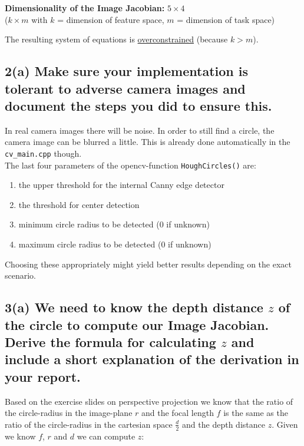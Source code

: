 \documentclass[a4paper,10pt]{article}
\begin{document}
\textbf{Dimensionality of the Image Jacobian:} $5 \times 4$\\
($k \times m$ with $k$ = dimension of feature space, $m$ = dimension of task space)

The resulting system of equations is \underline{overconstrained} (because $k > m$).


\subsection*{2(a) Make sure your implementation is tolerant to adverse camera images and document the steps you did to ensure this.}

In real camera images there will be noise. In order to still find a circle, the camera image can be blurred a little. This is already done automatically in the \texttt{cv\_main.cpp} though.\\
The last four parameters of the opencv-function \texttt{HoughCircles()} are:

\begin{enumerate}
  \item the upper threshold for the internal Canny edge detector
  \item the threshold for center detection
  \item minimum circle radius to be detected (0 if unknown)
  \item maximum circle radius to be detected (0 if unknown)
\end{enumerate}

Choosing these appropriately might yield better results depending on the exact scenario.


\subsection*{3(a) We need to know the depth distance $z$ of the circle to compute our Image Jacobian. Derive the formula for calculating $z$ and include a short explanation of the derivation in your report.}

Based on the exercise slides on perspective projection we know that the ratio of the circle-radius in the image-plane $r$ and the focal length $f$ is the same as the ratio of the circle-radius in the cartesian space $\frac{d}{2}$ and the depth distance $z$. Given we know $f$, $r$ and $d$ we can compute $z$:
\end{document}
